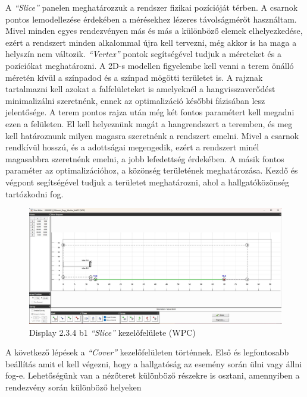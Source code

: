 A \textit{``Slice''} panelen meghatározzuk a rendszer fizikai pozícióját térben. A csarnok
pontos lemodellezése érdekében a mérésekhez lézeres távolságmérőt használtam.
Mivel minden egyes rendezvényen más és más a különböző elemek elhelyezkedése, ezért a
rendszert minden alkalommal újra kell tervezni, még akkor is ha maga a helyszín nem változik.
\textit{``Vertex''} pontok segítségével tudjuk a méreteket és a pozíciókat meghatározni.
A 2D-s modellen figyelembe kell venni a terem önálló méretén kívül a színpadod és a színpad mögötti területet is.
A rajznak tartalmazni kell azokat a falfelületeket is amelyeknél a hangvisszaverődést minimalizálni szeretnénk,
ennek az optimalizáció későbbi fázisában lesz jelentősége.
A terem pontos rajza után még két fontos paramétert kell megadni ezen a felületen.
El kell helyeznünk magát a hangrendszert a teremben, és meg kell határoznunk milyen magasra szeretnénk a rendszert emelni.
Mivel a csarnok rendkívül hosszú, és a adottságai megengedik, ezért a rendszert minél magasabbra szeretnénk emelni,
a jobb lefedettség érdekében.
A másik fontos paraméter az optimalizációhoz, a közönség területének meghatározása. Kezdő és végpont segítségével
tudjuk a területet meghatározni, ahol a hallgatóközönség tartózkodni fog.
\begin{figure}[H]
	\centering
	\includegraphics[width=\textwidth, keepaspectratio]{figures/display_wpc_1.jpg}
	\caption{Display 2.3.4 b1 \textit{``Slice''} kezelőfelülete (WPC)}\label{fig:display_wpc_1}
\end{figure}
A következő lépések a \textit{``Cover''} kezelőfelületen történnek.
Első és legfontosabb beállítás amit el kell végezni, hogy a hallgatóság az esemény során ülni vagy állni fog-e.
Lehetőségünk van a nézőteret különböző részekre is osztani, amennyiben a rendezvény során különböző helyeken

